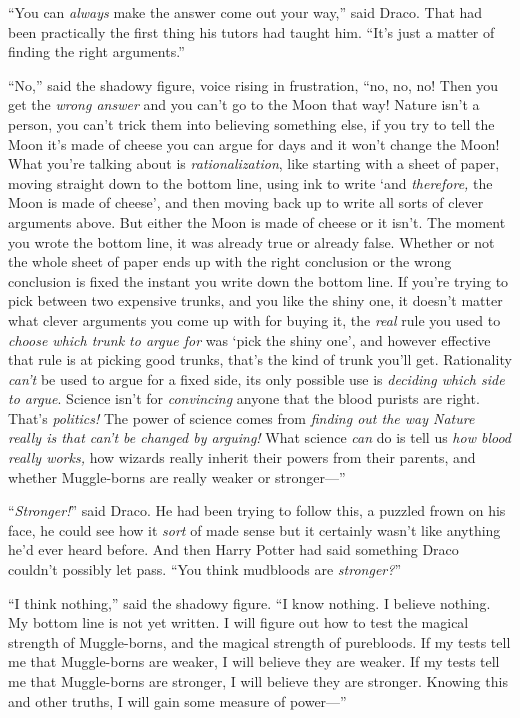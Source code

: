 “You can \emph{always} make the answer come out your way,” said Draco. That had been practically the first thing his tutors had taught him. “It’s just a matter of finding the right arguments.”

“No,” said the shadowy figure, voice rising in frustration, “no, no, no! Then you get the \emph{wrong answer} and you can’t go to the Moon that way! Nature isn’t a person, you can’t trick them into believing something else, if you try to tell the Moon it’s made of cheese you can argue for days and it won’t change the Moon! What you’re talking about is \emph{rationalization}, like starting with a sheet of paper, moving straight down to the bottom line, using ink to write ‘and \emph{therefore,} the Moon is made of cheese’, and then moving back up to write all sorts of clever arguments above. But either the Moon is made of cheese or it isn’t. The moment you wrote the bottom line, it was already true or already false. Whether or not the whole sheet of paper ends up with the right conclusion or the wrong conclusion is fixed the instant you write down the bottom line. If you’re trying to pick between two expensive trunks, and you like the shiny one, it doesn’t matter what clever arguments you come up with for buying it, the \emph{real} rule you used to \emph{choose which trunk to argue for} was ‘pick the shiny one’, and however effective that rule is at picking good trunks, that’s the kind of trunk you’ll get. Rationality \emph{can’t} be used to argue for a fixed side, its only possible use is \emph{deciding which side to argue}. Science isn’t for \emph{convincing} anyone that the blood purists are right. That’s \emph{politics!} The power of science comes from \emph{finding out the way Nature really is that can’t be changed by arguing!} What science \emph{can} do is tell us \emph{how blood really works,} how wizards really inherit their powers from their parents, and whether Muggle-borns are really weaker or stronger—”

“\emph{Stronger!}” said Draco. He had been trying to follow this, a puzzled frown on his face, he could see how it \emph{sort} of made sense but it certainly wasn’t like anything he’d ever heard before. And then Harry Potter had said something Draco couldn’t possibly let pass. “You think mudbloods are \emph{stronger?}”

“I think nothing,” said the shadowy figure. “I know nothing. I believe nothing. My bottom line is not yet written. I will figure out how to test the magical strength of Muggle-borns, and the magical strength of purebloods. If my tests tell me that Muggle-borns are weaker, I will believe they are weaker. If my tests tell me that Muggle-borns are stronger, I will believe they are stronger. Knowing this and other truths, I will gain some measure of power—”

